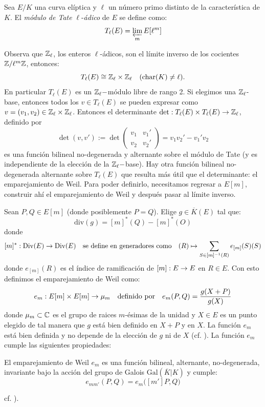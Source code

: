 \documentclass[../../tesis_maestria]{subfiles}
\begin{document}
\begin{defin}
  Sea $E/K$ una curva el\'iptica y $\ell$ un n\'umero primo distinto de la caracter\'istica de $K$.
  El \emph{m\'odulo de Tate} $\ell$-\emph{\'adico} de $E$ se define como:
  \[
    T_{\ell}(E)=\varprojlim_{m}E[\ell^m]
  \]
\end{defin}
Observa que $\mathbb{Z}_{\ell}$, los enteros $\ell$-\'adicos, son el l\'imite inverso de los cocientes
$\mathbb{Z}/\ell^m\mathbb{Z}$, entonces:
\[
  T_{\ell}(E)\cong \mathbb{Z}_{\ell}\times\mathbb{Z}_{\ell} \quad(\text{char}(K)\neq\ell).
\]
En particular $T_{\ell}(E)$ es un $\mathbb{Z}_{\ell}-$m\'odulo libre de rango 2. Si elegimos una
$\mathbb{Z}_{\ell}$-base, entonces todos los $v\in T_{\ell}(E)$ se pueden expresar como
$v=(v_1,v_2)\in\mathbb{Z}_{\ell}\times\mathbb{Z}_{\ell}$. Entonces el determinante
$\det:T_{\ell}(E)\times T_{\ell}(E)\rightarrow\mathbb{Z}_{\ell}$, definido por
\[
  \det(v,v'):=\det\begin{pmatrix}v_1&v_1'\\v_2&v_2'\end{pmatrix}=v_1v_2'-v_1'v_2
\]
es una funci\'on bilineal
no-degenerada y alternante sobre el m\'odulo de Tate (y es independiente de la elecci\'on de la
$\mathbb{Z}_{\ell}-$base). Hay otra funci\'on
bilineal no-degenerada alternante sobre $T_{\ell}(E)$ que resulta m\'as \'util que el determinante:
el emparejamiento de Weil. Para poder definirlo, necesitamos regresar a $E[m]$, construir ah\'i
el emparejamiento de Weil y despu\'es pasar al l\'imite inverso.

Sean $P,Q\in E[m]$ (donde posiblemente $P=Q$). Elige $g\in\overline{K}(E)$ tal que:
\[
  \mathrm{div}(g)=[m]^*(Q)-[m]^*(O)
\]
donde
\[
  [m]^*:\mathrm{Div}(E)\rightarrow\mathrm{Div}(E) \quad\text{se define en generadores como}\quad
  (R)\mapsto \sum_{S\in[m]^{-1}(R)}e_{[m]}(S)(S)
\]
donde $e_{[m]}(R)$ es el \'indice de ramificaci\'on de $[m]:E\rightarrow E$ en $R\in E$. Con esto definimos
el emparejamiento de Weil como:
\[
  e_m:E[m]\times E[m]\rightarrow \mu_m \quad\text{definido por} \quad e_m(P,Q)=\frac{g(X+P)}{g(X)}
\]
donde $\mu_m\subset\mathbb{C}$ es el grupo de raices $m$-\'esimas de la unidad y $X\in E$ es un punto
elegido de tal manera que $g$ est\'a bien definido en $X+P$ y en $X$. La funci\'on $e_m$ est\'a
bien definida y no depende de la elecci\'on de $g$ ni de $X$
(cf. \cite[cap\'itulo III, \S8]{SilvermanTAOEC}). La funci\'on $e_m$ cumple las siguientes
propiedades:

\begin{prop}
  El emparejamiento de Weil $e_m$ es una funci\'on bilineal, alternante, no-degenerada, invariante
  bajo la acci\'on del grupo de Galois $\mathrm{Gal}(\overline{K}|K)$ y cumple:
  \begin{equation}\label{eqn:weil_compatible}
    e_{mm'}(P,Q)=e_m\big([m']P,Q\big)
  \end{equation}
\end{prop}
\noindent cf. \cite[cap\'itulo III, proposici\'on 8.1]{SilvermanTAOEC}).
\end{document}
